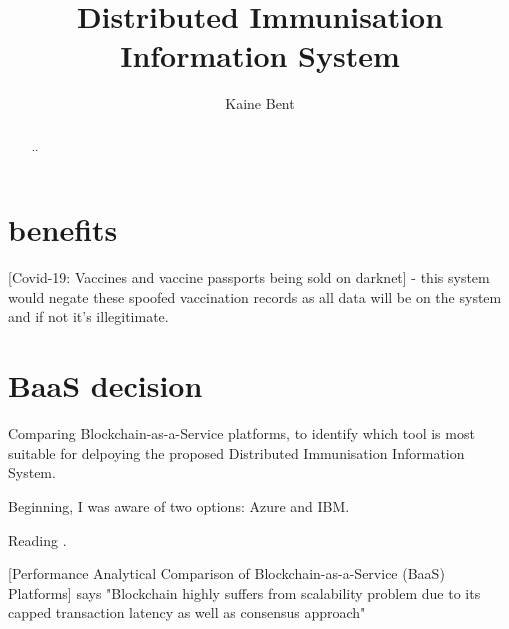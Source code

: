 \documentclass{article}
\title{Distributed Immunisation Information System}
\author{Kaine Bent}
\begin{document}
\begin{titlepage}
\maketitle
\end{titlepage}

\begin{abstract}
..
\end{abstract}

\begin{flushleft}
\section{benefits}
[Covid-19: Vaccines and vaccine passports being sold on darknet] - this system would negate these spoofed vaccination records as all data will be on the system and if not it's illegitimate.
\linebreak[3]

\section{BaaS decision}
Comparing Blockchain-as-a-Service platforms, to identify which tool is most suitable for delpoying the proposed Distributed Immunisation Information System.\linebreak[1]

Beginning, I was aware of two options: Azure and IBM.\linebreak[1]

Reading \cite{onik_performance_2019}.\linebreak[1]

[Performance Analytical Comparison of Blockchain-as-a-Service (BaaS) Platforms] says "Blockchain highly suffers from scalability problem due to its capped transaction
latency as well as consensus approach"\linebreak[1]

\end{flushleft}

\printbibliography
\end{document}

